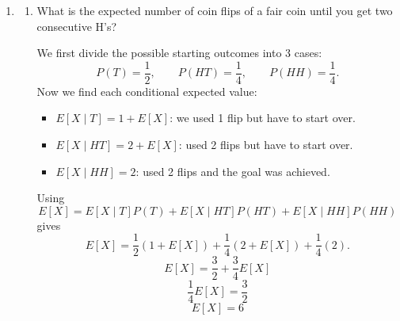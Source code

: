 \documentclass{article}
\begin{document}
\begin{enumerate}
\begin{enumerate}
        These arrangements are the non-negative integer solutions of $a_1 + a_2 + \cdots + a_{12} = 9$.

        There are $\binom{20}{11}$ such arrangements.

        \begin{enumerate}
            \item Compute the expected number of rooms without any prints.

            Let $X_i$ be 1 if room $i$ has no prints and 0 otherwise.
            If room $i$ is empty, the 9 prints go in the other 11 rooms. The number of ways to do that is
            \[
            \binom{9+11-1}{11-1} = \binom{19}{10}
            \]
            \[
            P(X_i = 1) = \frac{\binom{19}{10}}{\binom{20}{11}} = \frac{11}{20}
            \]
            \[
            \boxed{E[X] = 12 \cdot \frac{11}{20} = \frac{33}{5}}
            \]

            \item Compute the expected number of rooms with exactly 1 print.

            Let $X_i$ be 1 if room $i$ has exactly one print and 0 otherwise.
            If room $i$ has exactly one print, the other 8 prints go in the other 11 rooms. The number of ways to do that is
            \[
            \binom{8+11-1}{11-1} = \binom{18}{10}
            \]
            \[
            P(X_i = 1) = \frac{\binom{18}{10}}{\binom{20}{11}} = \frac{99}{380}
            \]
            \[
            \boxed{E[X] = 12 \cdot \frac{99}{380} = \frac{297}{95}}
            \]
        \end{enumerate}
    \end{enumerate}

    \item
    \begin{enumerate}
        \item What is the expected number of coin flips of a fair coin until you get two consecutive H's?

        We first divide the possible starting outcomes into 3 cases:
        \[
        P(T) = \frac{1}{2}, \qquad P(HT) = \frac{1}{4}, \qquad P(HH) = \frac{1}{4}.
        \]
        Now we find each conditional expected value:
        \begin{itemize}
            \item $E[X \mid T] = 1 + E[X]$: we used 1 flip but have to start over.
            \item $E[X \mid HT] = 2 + E[X]$: used 2 flips but have to start over.
            \item $E[X \mid HH] = 2$: used 2 flips and the goal was achieved.
        \end{itemize}
        Using
        \[
        E[X] = E[X \mid T]P(T) + E[X \mid HT]P(HT) + E[X \mid HH]P(HH)
        \]
        gives
        \[
        E[X] = \frac{1}{2}(1 + E[X]) + \frac{1}{4}(2 + E[X]) + \frac{1}{4}(2).
        \]
        \[
        E[X] = \frac{3}{2} + \frac{3}{4}E[X]
        \]
        \[
        \frac{1}{4}E[X] = \frac{3}{2}
        \]
        \[
        \boxed{E[X] = 6}
        \]


\end{enumerate}
\end{enumerate}
\end{document}
